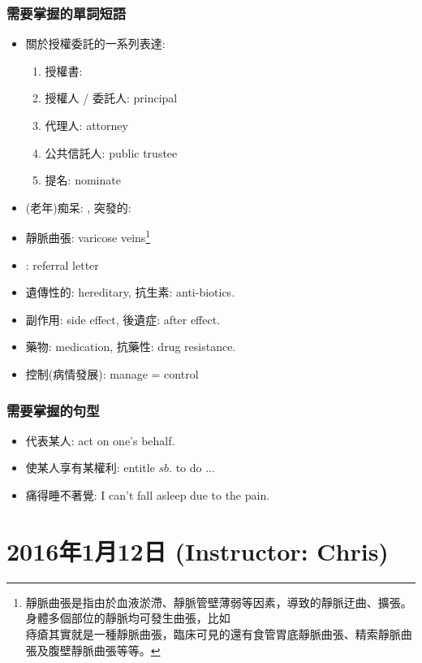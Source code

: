 \subsubsection*{需要掌握的單詞短語}
\begin{multicols}{2}
\begin{itemize}
  \itemsep0em
  \item 關於授權委託的一系列表達:
  \begin{enumerate}
  \itemsep0em
    \item 授權書: 
    \item 授權人 / 委託人: principal
    \item 代理人: attorney
    \item 公共信託人: public trustee
    \item 提名: nominate
  \end{enumerate}
  \item (老年)痴呆: , 突發的: 
  \item 靜脈曲張: varicose veins\footnote{靜脈曲張是指由於血液淤滯、靜脈管壁薄弱等因素，導致的靜脈迂曲、擴張。身體多個部位的靜脈均可發生曲張，比如\\痔瘡其實就是一種靜脈曲張，臨床可見的還有食管胃底靜脈曲張、精索靜脈曲張及腹壁靜脈曲張等等。}
  \item {}: referral letter
  \item 遺傳性的: hereditary, 抗生素: anti-biotics.
  \item 副作用: side effect, 後遺症: after effect.
  \item 藥物: medication, 抗藥性: drug resistance.
  \item 控制(病情發展): manage = control
\end{itemize}
\end{multicols}

\subsubsection*{需要掌握的句型}
\begin{itemize}
  \itemsep0em
  \item 代表某人: act on one's behalf.
  \item 使某人享有某權利: entitle $sb.$ to do ...
  \item 痛得睡不著覺: I can't fall asleep due to the pain.
\end{itemize}

\section{2016年1月12日 (Instructor: Chris)}
